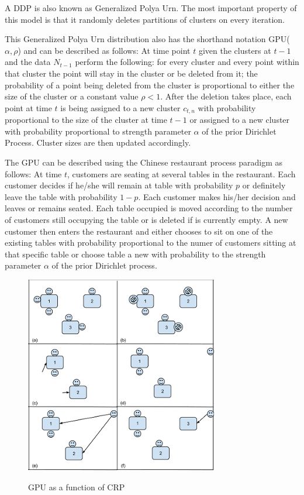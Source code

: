 \documentclass[twoside,hidelinks]{article}
\begin{document}
A DDP is also known as Generalized Polya Urn\cite{caron}. The most important property of this model is that it randomly deletes partitions of clusters on every iteration. 


This Generalized Polya Urn distribution also has the shorthand notation GPU($\alpha,\rho$) and can be described as follows: At time point $t$ given the clusters at $t-1$ and the data $N_{t-1}$ perform the following: for every cluster and every point within that cluster the point will stay in the cluster or be deleted from it; the probability of a point being deleted from the cluster is proportional to either the size of the cluster or a constant value $\rho <1$\cite{caron}. After the deletion takes place, each point at time $t$ is being assigned to a new cluster $c_{t,n}$  with probability proportional to the size of the cluster at time $t-1$ or assigned to a new cluster with probability proportional to strength parameter $\alpha$ of the prior Dirichlet Process. Cluster sizes are then updated accordingly.


The GPU can be described using the Chinese restaurant process paradigm as follows: At time $t$, customers are seating at several tables in the restaurant. Each customer decides if he/she will remain at table with probability $p$ or definitely leave the table with probability $1-p$. Each customer makes his/her decision and leaves or remains seated. Each table occupied is moved according to the number of customers still occupying the table or is deleted if is currently empty. A new customer then enters the restaurant and either chooses to sit on one of the existing tables with probability proportional to the numer of customers sitting at that specific table or choose table a new with probability to the strength parameter $\alpha$ of the prior Dirichlet process.


\begin{figure}
    \includegraphics[width=.53\textwidth]{generalPolya2}
    \label{generalPolya}
    \caption{GPU as a function of CRP}
\end{figure}
\end{document}
